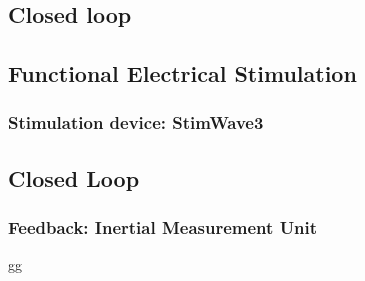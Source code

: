 \subsection{Closed loop}

\subsection{Functional Electrical Stimulation}

\subsubsection{Stimulation device: StimWave3}

\subsection{Closed Loop}

\subsubsection{Feedback: Inertial Measurement Unit}



gg
